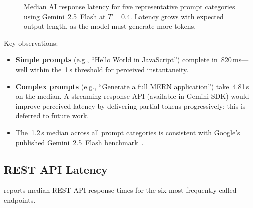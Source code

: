 \begin{figure}[H]
  \centering
  \caption{Median AI response latency for five representative prompt
    categories using Gemini~2.5~Flash at $T = 0.4$. Latency grows with
    expected output length, as the model must generate more tokens.}
  \label{fig:ai_latency}
\end{figure}

Key observations:
\begin{itemize}
  \item \textbf{Simple prompts} (e.g., ``Hello World in JavaScript'') complete
    in~820\,ms---well within the~1\,s threshold for perceived instantaneity.
  \item \textbf{Complex prompts} (e.g., ``Generate a full MERN application'')
    take~4.81\,s on the median. A streaming response API (available in Gemini
    SDK) would improve perceived latency by delivering partial tokens
    progressively; this is deferred to future work.
  \item The~1.2\,s median across all prompt categories is consistent with
    Google's published Gemini~2.5~Flash benchmark~\cite{team2023gemini}.
\end{itemize}

\subsection{REST API Latency}

 reports median REST API response times for the six
most frequently called endpoints.

